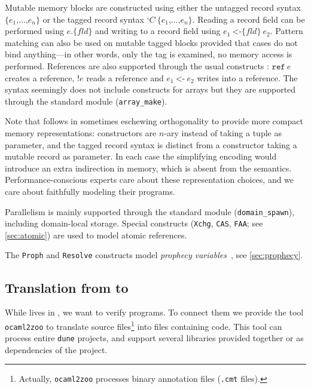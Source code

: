 Mutable memory blocks are constructed using either the untagged record syntax $\texttt{\{} e_1 \texttt{,} \dots \texttt{,} e_n \texttt{\}}$ or the tagged record syntax $\texttt{‘} C\ \texttt{\{} e_1 \texttt{,} \dots \texttt{,} e_n \texttt{\}}$.
Reading a record field can be performed using $e \texttt{.\{} \mathit{fld} \texttt{\}}$ and writing to a record field using $e_1\ \texttt{<-\{} \mathit{fld} \texttt{\}}\ e_2$.
Pattern matching can also be used on mutable tagged blocks provided that cases do not bind anything---in other words, only the tag is examined, no memory access is performed.
References are also supported through the usual constructs : $\texttt{ref}\ e$ creates a reference, $\texttt{!} e$ reads a reference and $e_1\ \texttt{<-}\ e_2$ writes into a reference.
The syntax seemingly does not include constructs for arrays but they are supported through the  standard module (\eg \texttt{array\_make}).

Note that \ZooLang follows \OCaml in sometimes eschewing orthogonality to provide more compact memory representations: constructors are $n$-ary instead of taking a tuple as parameter, and the tagged record syntax is distinct from a constructor taking a mutable record as parameter. In each case the simplifying encoding would introduce an extra indirection in memory, which is absent from the \ZooLang semantics. Performance-conscious experts care about these representation choices, and we care about faithfully modeling their programs.

Parallelism is mainly supported through the  standard module (\eg \texttt{domain\_spawn}), including domain-local storage.
Special constructs (\texttt{Xchg}, \texttt{CAS}, \texttt{FAA}; see \cref{sec:atomic}) are used to model atomic references.

The \texttt{Proph} and \texttt{Resolve} constructs model \emph{prophecy variables}~\cite{DBLP:journals/pacmpl/JungLPRTDJ20}, see \cref{sec:prophecy}.

\subsection{Translation from \OCaml to \ZooLang}



While \ZooLang lives in \Rocq, we want to verify \OCaml programs.
To connect them we provide the tool \texttt{ocaml2zoo} to translate \OCaml source files\footnote{Actually, \texttt{ocaml2zoo} processes binary annotation files (\texttt{.cmt} files).} into \Rocq files containing \ZooLang code.
This tool can process entire \texttt{dune} projects, and support several libraries provided together or as dependencies of the project.

